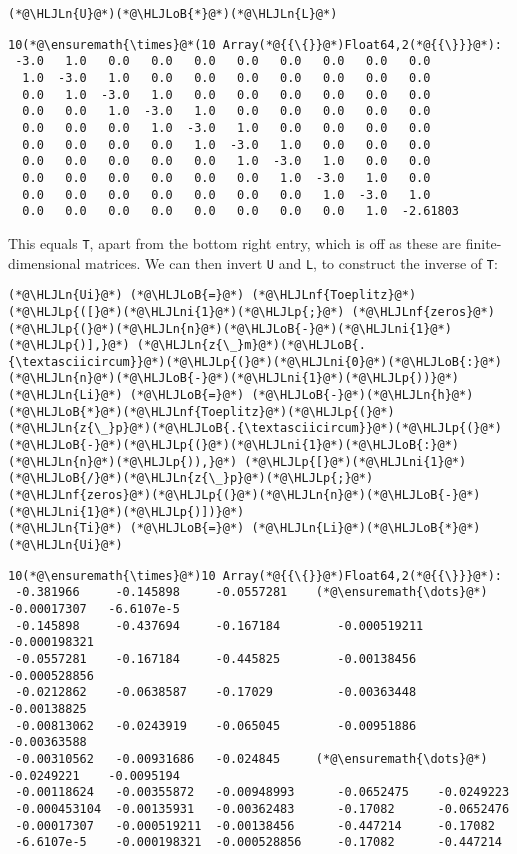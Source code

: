 \documentclass[12pt,landscape]{article}
\newcommand{\HLJLn}[1]{#1}
\newcommand{\HLJLnf}[1]{\textcolor[RGB]{66,102,213}{#1}}
\newcommand{\HLJLni}[1]{\textcolor[RGB]{59,151,46}{#1}}
\newcommand{\HLJLoB}[1]{\textcolor[RGB]{102,102,102}{\textbf{#1}}}
\newcommand{\HLJLp}[1]{#1}
\begin{document}
{\begin{lstlisting}
(*@\HLJLn{U}@*)(*@\HLJLoB{*}@*)(*@\HLJLn{L}@*)
\end{lstlisting}

\begin{lstlisting}
10(*@\ensuremath{\times}@*(10 Array(*@{{\{}}@*)Float64,2(*@{{\}}}@*):
 -3.0   1.0   0.0   0.0   0.0   0.0   0.0   0.0   0.0   0.0
  1.0  -3.0   1.0   0.0   0.0   0.0   0.0   0.0   0.0   0.0
  0.0   1.0  -3.0   1.0   0.0   0.0   0.0   0.0   0.0   0.0
  0.0   0.0   1.0  -3.0   1.0   0.0   0.0   0.0   0.0   0.0
  0.0   0.0   0.0   1.0  -3.0   1.0   0.0   0.0   0.0   0.0
  0.0   0.0   0.0   0.0   1.0  -3.0   1.0   0.0   0.0   0.0
  0.0   0.0   0.0   0.0   0.0   1.0  -3.0   1.0   0.0   0.0
  0.0   0.0   0.0   0.0   0.0   0.0   1.0  -3.0   1.0   0.0
  0.0   0.0   0.0   0.0   0.0   0.0   0.0   1.0  -3.0   1.0
  0.0   0.0   0.0   0.0   0.0   0.0   0.0   0.0   1.0  -2.61803
\end{lstlisting}


This equals \texttt{T}, apart from the bottom right entry, which is off as these are finite-dimensional matrices.
\newpage
We can then invert \texttt{U} and \texttt{L}, to construct the inverse of \texttt{T}:

\begin{lstlisting}
(*@\HLJLn{Ui}@*) (*@\HLJLoB{=}@*) (*@\HLJLnf{Toeplitz}@*)(*@\HLJLp{([}@*)(*@\HLJLni{1}@*)(*@\HLJLp{;}@*) (*@\HLJLnf{zeros}@*)(*@\HLJLp{(}@*)(*@\HLJLn{n}@*)(*@\HLJLoB{-}@*)(*@\HLJLni{1}@*)(*@\HLJLp{)],}@*) (*@\HLJLn{z{\_}m}@*)(*@\HLJLoB{.{\textasciicircum}}@*)(*@\HLJLp{(}@*)(*@\HLJLni{0}@*)(*@\HLJLoB{:}@*)(*@\HLJLn{n}@*)(*@\HLJLoB{-}@*)(*@\HLJLni{1}@*)(*@\HLJLp{))}@*)
(*@\HLJLn{Li}@*) (*@\HLJLoB{=}@*) (*@\HLJLoB{-}@*)(*@\HLJLn{h}@*)(*@\HLJLoB{*}@*)(*@\HLJLnf{Toeplitz}@*)(*@\HLJLp{(}@*)(*@\HLJLn{z{\_}p}@*)(*@\HLJLoB{.{\textasciicircum}}@*)(*@\HLJLp{(}@*)(*@\HLJLoB{-}@*)(*@\HLJLp{(}@*)(*@\HLJLni{1}@*)(*@\HLJLoB{:}@*)(*@\HLJLn{n}@*)(*@\HLJLp{)),}@*) (*@\HLJLp{[}@*)(*@\HLJLni{1}@*)(*@\HLJLoB{/}@*)(*@\HLJLn{z{\_}p}@*)(*@\HLJLp{;}@*) (*@\HLJLnf{zeros}@*)(*@\HLJLp{(}@*)(*@\HLJLn{n}@*)(*@\HLJLoB{-}@*)(*@\HLJLni{1}@*)(*@\HLJLp{)])}@*)
(*@\HLJLn{Ti}@*) (*@\HLJLoB{=}@*) (*@\HLJLn{Li}@*)(*@\HLJLoB{*}@*)(*@\HLJLn{Ui}@*)
\end{lstlisting}
{\Large
\begin{lstlisting}
10(*@\ensuremath{\times}@*)10 Array(*@{{\{}}@*)Float64,2(*@{{\}}}@*):
 -0.381966     -0.145898     -0.0557281    (*@\ensuremath{\dots}@*)  -0.00017307   -6.6107e-5  
 -0.145898     -0.437694     -0.167184        -0.000519211  -0.000198321
 -0.0557281    -0.167184     -0.445825        -0.00138456   -0.000528856
 -0.0212862    -0.0638587    -0.17029         -0.00363448   -0.00138825 
 -0.00813062   -0.0243919    -0.065045        -0.00951886   -0.00363588 
 -0.00310562   -0.00931686   -0.024845     (*@\ensuremath{\dots}@*)  -0.0249221    -0.0095194  
 -0.00118624   -0.00355872   -0.00948993      -0.0652475    -0.0249223  
 -0.000453104  -0.00135931   -0.00362483      -0.17082      -0.0652476  
 -0.00017307   -0.000519211  -0.00138456      -0.447214     -0.17082    
 -6.6107e-5    -0.000198321  -0.000528856     -0.17082      -0.447214
\end{lstlisting}}


}
\end{document}
